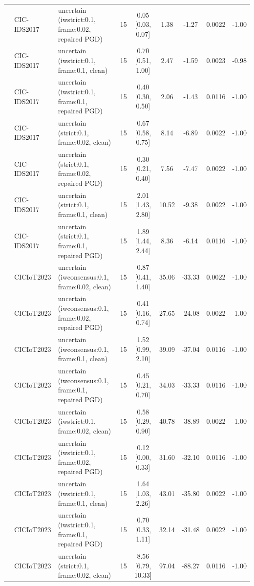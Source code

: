 \begin{table}[t]
\begin{tabular}{lllcccccc}
 & CIC-IDS2017 & uncertain (iwstrict:0.1, frame:0.02, repaired PGD) & 15 & 0.05 [0.03, 0.07] & 1.38 & -1.27 & 0.0022 & -1.00 \\
 & CIC-IDS2017 & uncertain (iwstrict:0.1, frame:0.1, clean) & 15 & 0.70 [0.51, 1.00] & 2.47 & -1.59 & 0.0023 & -0.98 \\
 & CIC-IDS2017 & uncertain (iwstrict:0.1, frame:0.1, repaired PGD) & 15 & 0.40 [0.30, 0.50] & 2.06 & -1.43 & 0.0116 & -1.00 \\
 & CIC-IDS2017 & uncertain (strict:0.1, frame:0.02, clean) & 15 & 0.67 [0.58, 0.75] & 8.14 & -6.89 & 0.0022 & -1.00 \\
 & CIC-IDS2017 & uncertain (strict:0.1, frame:0.02, repaired PGD) & 15 & 0.30 [0.21, 0.40] & 7.56 & -7.47 & 0.0022 & -1.00 \\
 & CIC-IDS2017 & uncertain (strict:0.1, frame:0.1, clean) & 15 & 2.01 [1.43, 2.80] & 10.52 & -9.38 & 0.0022 & -1.00 \\
 & CIC-IDS2017 & uncertain (strict:0.1, frame:0.1, repaired PGD) & 15 & 1.89 [1.44, 2.44] & 8.36 & -6.14 & 0.0116 & -1.00 \\
 & CICIoT2023 & uncertain (iwconsensus:0.1, frame:0.02, clean) & 15 & 0.87 [0.41, 1.40] & 35.06 & -33.33 & 0.0022 & -1.00 \\
 & CICIoT2023 & uncertain (iwconsensus:0.1, frame:0.02, repaired PGD) & 15 & 0.41 [0.16, 0.74] & 27.65 & -24.08 & 0.0022 & -1.00 \\
 & CICIoT2023 & uncertain (iwconsensus:0.1, frame:0.1, clean) & 15 & 1.52 [0.99, 2.10] & 39.09 & -37.04 & 0.0116 & -1.00 \\
 & CICIoT2023 & uncertain (iwconsensus:0.1, frame:0.1, repaired PGD) & 15 & 0.45 [0.21, 0.70] & 34.03 & -33.33 & 0.0116 & -1.00 \\
 & CICIoT2023 & uncertain (iwstrict:0.1, frame:0.02, clean) & 15 & 0.58 [0.29, 0.90] & 40.78 & -38.89 & 0.0022 & -1.00 \\
 & CICIoT2023 & uncertain (iwstrict:0.1, frame:0.02, repaired PGD) & 15 & 0.12 [0.00, 0.33] & 31.60 & -32.10 & 0.0116 & -1.00 \\
 & CICIoT2023 & uncertain (iwstrict:0.1, frame:0.1, clean) & 15 & 1.64 [1.03, 2.26] & 43.01 & -35.80 & 0.0022 & -1.00 \\
 & CICIoT2023 & uncertain (iwstrict:0.1, frame:0.1, repaired PGD) & 15 & 0.70 [0.33, 1.11] & 32.14 & -31.48 & 0.0022 & -1.00 \\
 & CICIoT2023 & uncertain (strict:0.1, frame:0.02, clean) & 15 & 8.56 [6.79, 10.33] & 97.04 & -88.27 & 0.0116 & -1.00 \\

\end{tabular}
\end{table}
